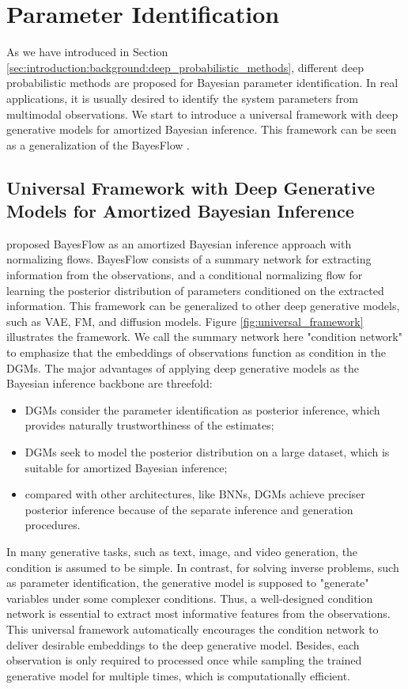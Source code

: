 \section{Parameter Identification}
\label{sec:methods:parameter_identification}

As we have introduced in Section \ref{sec:introduction:background:deep_probabilistic_methods}, different deep probabilistic methods are proposed for Bayesian parameter identification. In real applications, it is usually desired to identify the system parameters from multimodal observations. We start to introduce a universal framework with deep generative models for amortized Bayesian inference. This framework can be seen as a generalization of the BayesFlow \citep{radev2020bayesflow}.

\subsection{Universal Framework with Deep Generative Models for Amortized Bayesian Inference}
\citeauthor{radev2020bayesflow} \citeyearpar{radev2020bayesflow} proposed BayesFlow as an amortized Bayesian inference approach with normalizing flows. BayesFlow consists of a summary network for extracting information from the observations, and a conditional normalizing flow for learning the posterior distribution of parameters conditioned on the extracted information. This framework can be generalized to other deep generative models, such as \ac{VAE}, \ac{FM}, and diffusion models. Figure \ref{fig:universal_framework} illustrates the framework. We call the summary network here "condition network" to emphasize that the embeddings of observations function as condition in the \acp{DGM}. The major advantages of applying deep generative models as the Bayesian inference backbone are threefold:
\begin{itemize}
    \item \acp{DGM} consider the parameter identification as posterior inference, which provides naturally trustworthiness of the estimates;
    \item \acp{DGM} seek to model the posterior distribution on a large dataset, which is suitable for amortized Bayesian inference;
    \item compared with other architectures, like \acp{BNN}, \acp{DGM} achieve preciser posterior inference because of the separate inference and generation procedures.
\end{itemize}

In many generative tasks, such as text, image, and video generation, the condition is assumed to be simple. In contrast, for solving inverse problems, such as parameter identification, the generative model is supposed to "generate" variables under some complexer conditions. Thus, a well-designed condition network is essential to extract most informative features from the observations. This universal framework automatically encourages the condition network to deliver desirable embeddings to the deep generative model. Besides, each observation is only required to processed once while sampling the trained generative model for multiple times, which is computationally efficient. 

